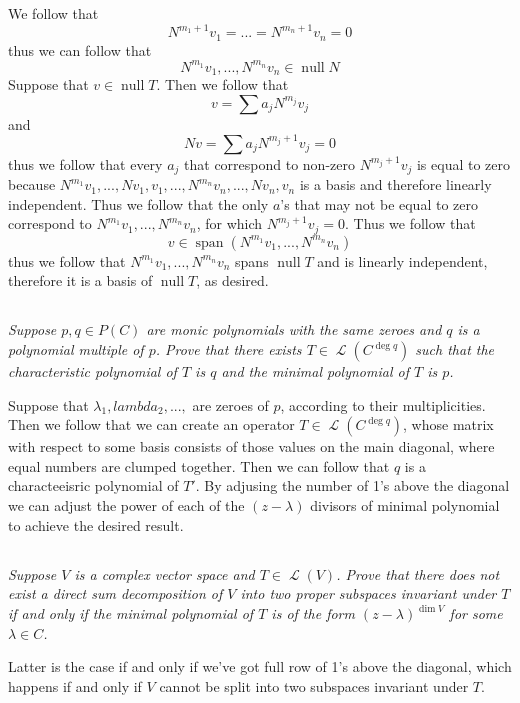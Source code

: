 \documentclass[11pt,oneside,titlepage]{book}
\DeclareMathOperator \map {\mathcal {L}}
\DeclareMathOperator \ns {null}
\DeclareMathOperator \Span {span}
\begin{document}
We follow that
$$N^{m_1 + 1}v_1 =  ... = N^{m_n + 1}v_n = 0$$
thus we can follow that 
$$N^{m_1}v_1, ..., N^{m_n}v_n \in \ns N$$
Suppose that $v \in \ns T$. Then we follow that
$$v = \sum{a_j N^{m_j} v_j}$$
and
$$Nv = \sum{a_j N^{m_j + 1} v_j} = 0$$
thus we follow that every $a_j$ that correspond to non-zero $N^{m_j + 1} v_j$ is equal to zero
because $N^{m_1}v_1 ,..., N v_1, v_1, ..., N^{m_n}v_n ,..., N v_n, v_n$  is a basis and
therefore linearly independent. Thus we follow that the only $a$'s that may not be equal to zero
correspond to $N^{m_1}v_1, ..., N^{m_n}v_n$, for which $N^{m_j + 1}v_j = 0$. Thus we follow that
$$v \in \Span(N^{m_1}v_1, ..., N^{m_n}v_n)$$
thus we follow that $N^{m_1}v_1, ..., N^{m_n}v_n$ spans $\ns T$ and is linearly independent, therefore
it is a basis of $\ns T$, as desired.

\subsection{}

\textit{Suppose $p, q \in P(C)$ are monic polynomials with the same zeroes and $q$ is a
  polynomial multiple of $p$. Prove that there exists $T \in \map(C^{\deg q})$ such that
  the characteristic polynomial of $T$ is $q$ and the minimal polynomial of $T$ is $p$.
}

Suppose that $\lambda_1,lambda_2, ..., $ are zeroes of $p$, according to their multiplicities.
Then we follow that we can create an operator $T \in \map(C^{\deg q})$, whose matrix with
respect to some basis consists of those values on the main diagonal, where
equal numbers are clumped together. Then we can follow that $q$ is a characteeisric
polynomial of $T'$. By adjusing the number of 1's above the diagonal
we can adjust the power of each of the $(z - \lambda)$ divisors of minimal polynomial to achieve the
desired result.

\subsection{}

\textit{Suppose $V$ is a complex vector space and $T \in \map(V)$. Prove that there
  does not exist a direct sum decomposition of $V$ into two proper subspaces invariant
  under $T$ if and only if the minimal polynomial of $T$ is of the form $(z - \lambda)^{\dim V}$ for
  some $\lambda \in C$.}

Latter is the case if and only if we've got full row of 1's above the diagonal, which happens if
and only if $V$ cannot be split into two subspaces invariant under $T$.
\end{document}
